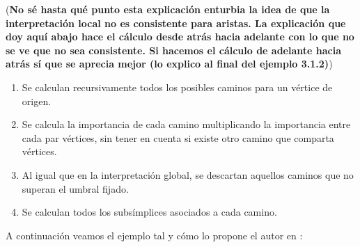 \documentclass[12pt, a4paper, twoside]{book}
\numberwithin{equation}{section}
\theoremstyle{definition}
\theoremstyle{remark}
\theoremstyle{plain}
\begin{document}
	(\textbf{No sé hasta qué punto esta explicación enturbia la idea de
	que la interpretación local no es consistente para aristas. La 
	explicación que doy aquí abajo hace el cálculo desde atrás hacia 
	adelante con lo que no se ve que no sea consistente. Si hacemos el 
	cálculo de adelante hacia atrás sí que se aprecia mejor (lo explico al 
	final del ejemplo 3.1.2)})

	\begin{enumerate}[label=\arabic*)]
		\item Se calculan recursivamente todos los posibles caminos 
			para un vértice de origen. 
		\item Se calcula la importancia de cada camino multiplicando 
			la importancia entre cada par vértices, sin tener en 
			cuenta si existe otro camino que comparta vértices.
		\item Al igual que en la interpretación global, se descartan 
			aquellos caminos que no superan el umbral fijado. 

		\item Se calculan todos los subsímplices asociados a cada 
			camino.
	\end{enumerate}

	A continuación veamos el ejemplo tal y cómo lo propone el autor en 
	\cite{Articulo-Watanabe}:
	
\end{document}

